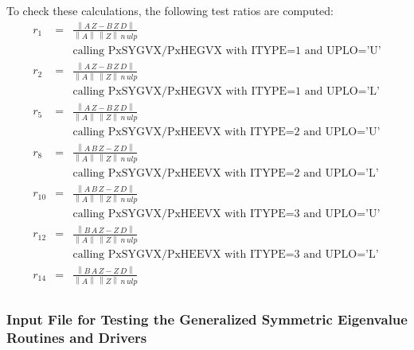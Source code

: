\documentclass[11pt]{report}
\newcommand{\leftnorm}{\left\|}
\newcommand{\rightnorm}{\right\|}
\begin{document}
To check these calculations, the following test ratios are computed:
\begin{eqnarray}
        r_1&=&\frac{ \leftnorm A \, Z - B \, Z \, D \rightnorm }
                   { \leftnorm A\rightnorm \, \leftnorm Z \rightnorm \, n \, ulp} \nonumber \\
           & &\mbox{calling PxSYGVX/PxHEGVX with ITYPE=1 and UPLO='U'} \nonumber \\
        r_2&=&\frac{ \leftnorm A \, Z - B \, Z \, D \rightnorm }
                   { \leftnorm A\rightnorm \, \leftnorm Z \rightnorm \, n \, ulp} \nonumber \\
           & &\mbox{calling PxSYGVX/PxHEGVX with ITYPE=1 and UPLO='L'} \nonumber \\
        r_5&=&\frac{ \leftnorm A \, Z - B \, Z \, D \rightnorm }
                   { \leftnorm A\rightnorm \, \leftnorm Z \rightnorm \, n \, ulp} \nonumber \\
           & &\mbox{calling PxSYGVX/PxHEEVX with ITYPE=2 and UPLO='U'} \nonumber \\
        r_8&=&\frac{ \leftnorm A \, B \, Z - Z \, D \rightnorm }
                   { \leftnorm A\rightnorm \, \leftnorm Z \rightnorm \, n \, ulp} \nonumber \\
           & &\mbox{calling PxSYGVX/PxHEEVX with ITYPE=2 and UPLO='L'} \nonumber \\
        r_{10}&=&\frac{ \leftnorm A \, B \, Z - Z \, D \rightnorm }
                   { \leftnorm A\rightnorm \, \leftnorm Z \rightnorm \, n \, ulp} \nonumber \\
           & &\mbox{calling PxSYGVX/PxHEEVX with ITYPE=3 and UPLO='U'} \nonumber \\
        r_{12}&=&\frac{ \leftnorm B \, A \, Z - Z \, D \rightnorm }
                   { \leftnorm A\rightnorm \, \leftnorm Z \rightnorm \, n \, ulp} \nonumber \\
           & &\mbox{calling PxSYGVX/PxHEEVX with ITYPE=3 and UPLO='L'} \nonumber \\
        r_{14}&=&\frac{ \leftnorm B \, A \, Z - Z \, D \rightnorm }
                   { \leftnorm A\rightnorm \, \leftnorm Z \rightnorm \, n \, ulp} \nonumber \\
\end{eqnarray}

\subsubsection{Input File for Testing the Generalized Symmetric Eigenvalue Routines and Drivers}
\end{document}
